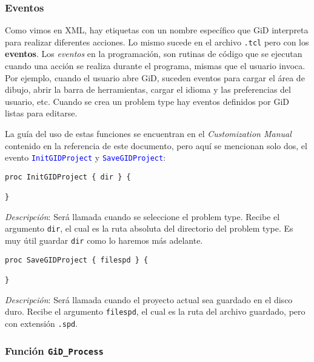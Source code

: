 \documentclass[10pt, a4paper, twocolumn]{article}
\begin{document}
\subsubsection{Eventos} \label{sec:eventosGiD}

Como vimos en XML, hay etiquetas con un nombre específico que GiD interpreta para realizar diferentes acciones. Lo mismo sucede en el archivo \texttt{.tcl} pero con los \textbf{eventos}. Los \textit{eventos} en la programación, son rutinas de código que se ejecutan cuando una acción se realiza durante el programa, mismas que el usuario invoca. Por ejemplo, cuando el usuario abre GiD, suceden eventos para cargar el área de dibujo, abrir la barra de herramientas, cargar el idioma y las preferencias del usuario, etc. Cuando se crea un problem type hay eventos definidos por GiD listas para editarse.

La guía del uso de estas funciones se encuentran en el \textit{Customization Manual} contenido en la referencia de este documento, pero aquí se mencionan solo dos, el evento \textcolor{blue}{\texttt{InitGIDProject}} y \textcolor{blue}{\texttt{SaveGIDProject}}:

\lstset{language=tcl} 
\begin{lstlisting}[caption={Evento que se ejecuta al iniciar el problemtype.}]
proc InitGIDProject { dir } {

}
\end{lstlisting}

\textit{Descripción}: Será llamada cuando se seleccione el problem type. Recibe el argumento \texttt{dir}, el cual es la ruta absoluta del directorio del problem type. Es muy útil guardar \texttt{dir} como lo haremos más adelante.

\begin{lstlisting}[caption={Evento que se ejecuta al guardar un proyecto en GiD durante la ejecución de un problem type.}]
proc SaveGIDProject { filespd } {

}
\end{lstlisting}

\textit{Descripción}: Será llamada cuando el proyecto actual sea guardado en el disco duro. Recibe el argumento \texttt{filespd}, el cual es la ruta del archivo guardado, pero con extensión \texttt{.spd}.

\subsubsection{Función \texttt{GiD\_Process}} \label{sec:GiDProcess}
\end{document}
